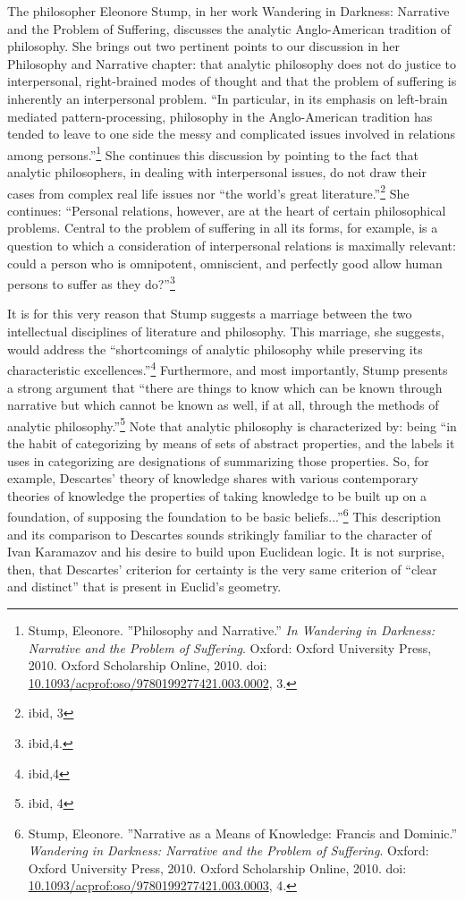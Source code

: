 The philosopher Eleonore Stump, in her work Wandering in Darkness: Narrative and the Problem of Suffering, discusses the analytic Anglo-American tradition of philosophy. She brings out two pertinent points to our discussion in her Philosophy and Narrative chapter: that analytic philosophy does not do justice to interpersonal, right-brained modes of thought and that the problem of suffering is inherently an interpersonal problem. ``In particular, in its emphasis on left-brain mediated pattern-processing, philosophy in the Anglo-American tradition has tended to leave to one side the messy and complicated issues involved in relations among persons.''\footnote{Stump, Eleonore. ''Philosophy and Narrative.'' \emph{In Wandering in Darkness: Narrative and the Problem of Suffering}. Oxford: Oxford University Press, 2010. Oxford Scholarship Online, 2010. doi: \url{10.1093/acprof:oso/9780199277421.003.0002}, 3.} She continues this discussion by pointing to the fact that analytic philosophers, in dealing with interpersonal issues, do not draw their cases from complex real life issues nor ``the world's great literature.''\footnote{ibid, 3} She continues: ``Personal relations, however, are at the heart of certain philosophical problems. Central to the problem of suffering in all its forms, for example, is a question to which a consideration of interpersonal relations is maximally relevant: could a person who is omnipotent, omniscient, and perfectly good allow human persons to suffer as they do?''\footnote{ibid,4.}

It is for this very reason that Stump suggests a marriage between the two intellectual disciplines of literature and philosophy. This marriage, she suggests, would address the ``shortcomings of analytic philosophy while preserving its characteristic excellences.''\footnote{ibid,4} Furthermore, and most importantly, Stump presents a strong argument that ``there are things to know which can be known through narrative but which cannot be known as well, if at all, through the methods of analytic philosophy.''\footnote{ibid, 4} Note that analytic philosophy is characterized by: being ``in the habit of categorizing by means of sets of abstract properties, and the labels it uses in categorizing are designations of summarizing those properties. So, for example, Descartes' theory of knowledge shares with various contemporary theories of knowledge the properties of taking knowledge to be built up on a foundation, of supposing the foundation to be basic beliefs...''\footnote{Stump, Eleonore. ''Narrative as a Means of Knowledge: Francis and Dominic.'' \emph{Wandering in Darkness: Narrative and the Problem of Suffering}. Oxford: Oxford University Press, 2010. Oxford Scholarship Online, 2010. doi: \url{10.1093/acprof:oso/9780199277421.003.0003}, 4.} This description and its comparison to Descartes sounds strikingly familiar to the character of Ivan Karamazov and his desire to build upon Euclidean logic. It is not surprise, then, that Descartes' criterion for certainty is the very same criterion of ``clear and distinct'' that is present in Euclid's geometry.

